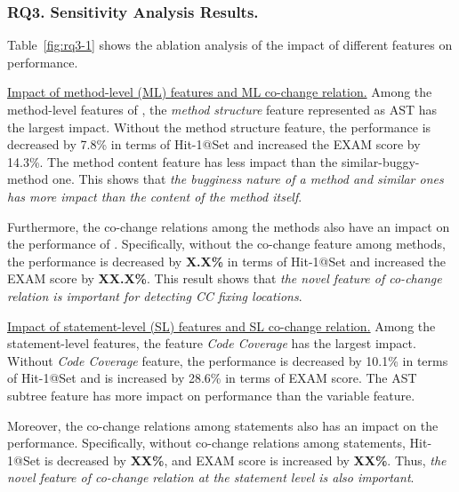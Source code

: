 \subsubsection{\bf RQ3. Sensitivity Analysis Results.}

Table~\ref{fig:rq3-1} shows the ablation analysis of the
impact of different features on performance. 

\underline{Impact of method-level (ML) features and ML co-change relation.}
Among the method-level features of {\tool}, the {\it method structure}
feature represented as AST has the largest impact. Without the method
structure feature, the performance is decreased by 7.8\% in terms of
Hit-1@Set and increased the EXAM score by 14.3\%. The method content
feature has less impact than the similar-buggy-method one. This
shows that {\em the bugginess nature of a method and similar ones has
more impact than the content of the method itself}.


Furthermore, the co-change relations among the methods also have an
impact on the performance of {\tool}. Specifically, without the
co-change feature among methods, the performance is decreased by {\bf
X.X\%} in terms of Hit-1@Set and increased the EXAM score by {\bf
XX.X\%}. This result shows that {\em the novel feature of co-change
relation is important for detecting CC fixing locations}.


\underline{Impact of statement-level (SL) features and SL co-change relation.}
Among the statement-level features, the feature {\it Code Coverage}
has the largest impact. Without {\it Code Coverage} feature, the
performance is decreased by 10.1\% in terms of Hit-1@Set and is
increased by 28.6\% in terms of EXAM score. The AST subtree feature
has more impact on performance than the variable feature.

Moreover, the co-change relations among statements also has an impact
on the performance. Specifically, without co-change relations among
statements, Hit-1@Set is decreased by {\bf XX\%}, and EXAM score is
increased by {\bf XX\%}. Thus, {\em the novel feature of co-change
relation at the statement level is also important}.


